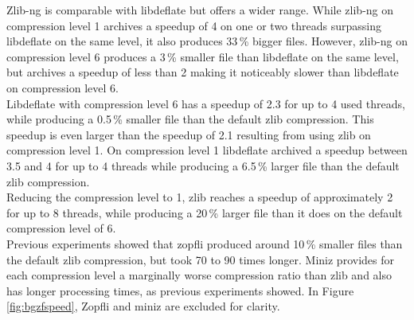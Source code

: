 Zlib-ng is comparable with libdeflate but offers a wider range. While zlib-ng on compression level 1 archives a speedup of 4 on one or two threads surpassing libdeflate on the same level, it also produces 33\,\% bigger files. However, zlib-ng on compression level 6 produces a 3\,\% smaller file than libdeflate on the same level, but archives a speedup of less than 2 making it noticeably slower than libdeflate on compression level 6. \\
Libdeflate with compression level 6 has a speedup of 2.3 for up to 4 used threads, while producing a 0.5\,\% smaller file than the default zlib compression. This speedup is even larger than the speedup of 2.1 resulting from using zlib on compression level 1. On compression level 1 libdeflate archived a speedup between 3.5 and 4 for up to 4 threads while producing a 6.5\,\% larger file than the default zlib compression. \\
Reducing the compression level to 1, zlib reaches a speedup of approximately 2 for up to 8 threads, while producing a 20\,\% larger file than it does on the default compression level of 6. \\
 Previous experiments showed that zopfli produced around 10\,\% smaller files than the default zlib compression, but took 70 to 90 times longer.   
Miniz provides for each compression level a marginally worse compression ratio than zlib and also has longer processing times, as previous experiments showed. In Figure \ref{fig:bgzfspeed}, Zopfli and miniz are excluded for clarity.\\

